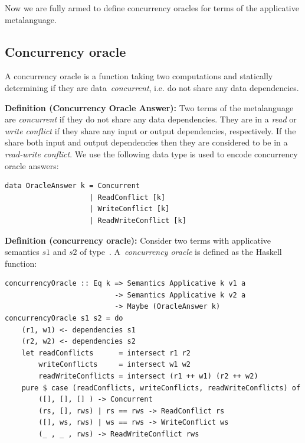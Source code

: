 Now we are fully armed to define concurrency oracles for terms of the
applicative metalanguage.

\subsection{Concurrency oracle}
A concurrency oracle is a function taking two computations and statically
determining if they are data~\emph{concurrent}, i.e. do not share any
data dependencies.


\textbf{Definition (Concurrency Oracle Answer):\label{def:concurrency-status}}
Two terms of the metalanguage are \emph{concurrent} if they do not share any
data dependencies. They are in a \emph{read} or \emph{write conflict} if they
share any input or output dependencies, respectively. If the share both input
and output dependencies then they are considered to be in a \emph{read-write
conflict}. We use the following data type is used to encode concurrency oracle
answers:

\begin{verbatim}
data OracleAnswer k = Concurrent
                    | ReadConflict [k]
                    | WriteConflict [k]
                    | ReadWriteConflict [k]
\end{verbatim}

\textbf{Definition (concurrency oracle):\label{def:oracle}}
Consider two terms with applicative semantics $s1$ and $s2$ of
type~. A~\emph{concurrency oracle} is defined as the
Haskell function:
\begin{verbatim}
concurrencyOracle :: Eq k => Semantics Applicative k v1 a
                          -> Semantics Applicative k v2 a
                          -> Maybe (OracleAnswer k)
concurrencyOracle s1 s2 = do
    (r1, w1) <- dependencies s1
    (r2, w2) <- dependencies s2
    let readConflicts      = intersect r1 r2
        writeConflicts     = intersect w1 w2
        readWriteConflicts = intersect (r1 ++ w1) (r2 ++ w2)
    pure $ case (readConflicts, writeConflicts, readWriteConflicts) of
        ([], [], [] ) -> Concurrent
        (rs, [], rws) | rs == rws -> ReadConflict rs
        ([], ws, rws) | ws == rws -> WriteConflict ws
        (_ , _ , rws) -> ReadWriteConflict rws
\end{verbatim}


